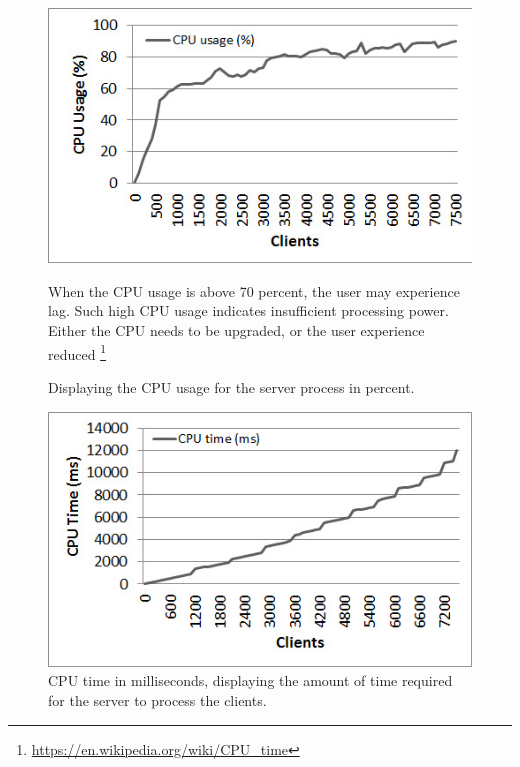 \documentclass[12pt]{article}
\begin{document}
\begin{center}

\begin{figure}
\includegraphics[scale=0.75]{test_CLIENT_CPUusage.jpg}
\caption{Displaying the CPU usage for the server process in percent.}
\vspace{1em}
When the CPU usage is above 70 percent, the user may experience lag. Such high CPU usage indicates insufficient processing power. Either the CPU needs to be upgraded, or the user experience reduced 
\footnote{\url{https://en.wikipedia.org/wiki/CPU_time}}
\end{figure}


\begin{figure}
\includegraphics[scale=0.75]{test_CLIENT_CPUtime.jpg}
\caption{CPU time in milliseconds, displaying the amount of time required for the server to process the clients.}
\end{figure}



\end{center}
\end{document}
